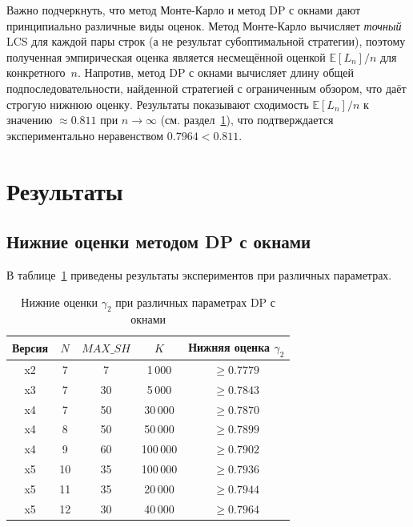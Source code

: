 \documentclass[12pt,a4paper]{article}
\begin{document}
Важно подчеркнуть, что метод Монте-Карло и метод DP с окнами дают принципиально различные виды оценок.
Метод Монте-Карло вычисляет \emph{точный} LCS для каждой пары строк (а не результат субоптимальной стратегии), поэтому полученная эмпирическая оценка является несмещённой оценкой $\mathbb{E}[L_n]/n$ для конкретного~$n$.
Напротив, метод DP с окнами вычисляет длину общей подпоследовательности, найденной стратегией с ограниченным обзором, что даёт строгую нижнюю оценку.
Результаты показывают сходимость $\mathbb{E}[L_n]/n$ к значению $\approx 0.811$ при $n \to \infty$ (см. раздел~\ref{sec:results}), что подтверждается экспериментально неравенством $0.7964 < 0.811$.

\section{Результаты}
\label{sec:results}

\subsection{Нижние оценки методом DP с окнами}

В таблице~\ref{tab:dp_results} приведены результаты экспериментов при различных параметрах.

\begin{table}[h]
\centering
\caption{Нижние оценки $\gamma_2$ при различных параметрах DP с окнами}
\label{tab:dp_results}
\begin{tabular}{ccccc}
  \toprule
  Версия & $N$ & $\mathit{MAX\_SH}$ & $K$ & Нижняя оценка $\gamma_2$ \\
  \midrule
  x2 & 7 & 7 & 1\,000 & $\geq 0.7779$ \\
  x3 & 7 & 30 & 5\,000 & $\geq 0.7843$ \\
  x4 & 7 & 50 & 30\,000 & $\geq 0.7870$ \\
  x4 & 8 & 50 & 50\,000 & $\geq 0.7899$ \\
  x4 & 9 & 60 & 100\,000 & $\geq 0.7902$ \\
  x5 & 10 & 35 & 100\,000 & $\geq 0.7936$ \\
  x5 & 11 & 35 & 20\,000 & $\geq 0.7944$ \\
  x5 & 12 & 30 & 40\,000 & $\geq \mathbf{0.7964}$ \\
  \bottomrule
\end{tabular}
\end{table}
\end{document}
